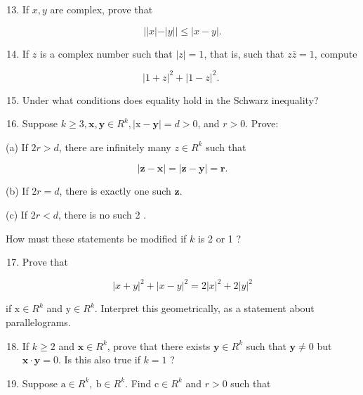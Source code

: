 \documentclass[10pt]{article}
\begin{document}
\begin{enumerate}
  \setcounter{enumi}{12}
  \item If $x, y$ are complex, prove that
\end{enumerate}

$$
|| x|-| y|| \leq|x-y| .
$$

\begin{enumerate}
  \setcounter{enumi}{13}
  \item If $z$ is a complex number such that $|z|=1$, that is, such that $z \bar{z}=1$, compute
\end{enumerate}

$$
|1+z|^{2}+|1-z|^{2} \text {. }
$$

\begin{enumerate}
  \setcounter{enumi}{14}
  \item Under what conditions does equality hold in the Schwarz inequality?

  \item Suppose $k \geq 3, \mathbf{x}, \mathbf{y} \in R^{k},|\mathrm{x}-\mathbf{y}|=d>0$, and $r>0$. Prove:

\end{enumerate}

(a) If $2 r>d$, there are infinitely many $z \in R^{k}$ such that

$$
|\mathbf{z}-\mathbf{x}|=|\mathbf{z}-\mathbf{y}|=\boldsymbol{r} .
$$

(b) If $2 r=d$, there is exactly one such $\mathbf{z}$.

(c) If $2 r<d$, there is no such 2 .

How must these statements be modified if $k$ is 2 or 1 ?

\begin{enumerate}
  \setcounter{enumi}{16}
  \item Prove that
\end{enumerate}

$$
|x+y|^{2}+|x-y|^{2}=2|x|^{2}+2|y|^{2}
$$

if $\mathrm{x} \in R^{k}$ and $\mathrm{y} \in R^{k}$. Interpret this geometrically, as a statement about parallelograms.

\begin{enumerate}
  \setcounter{enumi}{17}
  \item If $k \geq 2$ and $\mathbf{x} \in R^{k}$, prove that there exists $\mathbf{y} \in R^{k}$ such that $\mathbf{y} \neq 0$ but $\mathbf{x} \cdot \mathbf{y}=0$. Is this also true if $k=1$ ?

  \item Suppose $\mathrm{a} \in R^{k}, \mathrm{~b} \in R^{k}$. Find $\mathrm{c} \in R^{k}$ and $r>0$ such that

\end{enumerate}
\end{document}

